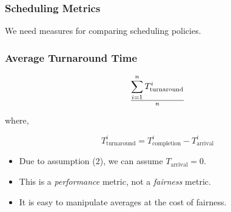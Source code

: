 \begin{frame}

\frametitle{Scheduling Metrics}

\begin{center}

We need measures for comparing scheduling policies.

\end{center}

\end{frame}


\begin{frame}

\frametitle{Average Turnaround Time}

$${\sum_{i=1}^n T^i_{\text{turnaround}}} \over n$$

where,

$$T^i_{\text{turnaround}} = T^i_{\text{completion}} - T^i_{\text{arrival}}$$

\begin{itemize}

\item Due to assumption (2), we can assume $T_{\text{arrival}} = 0$.

\item This is a \emph{performance} metric, not a \emph{fairness} metric.

\item It is easy to manipulate averages at the cost of fairness.

\end{itemize}

\end{frame}
